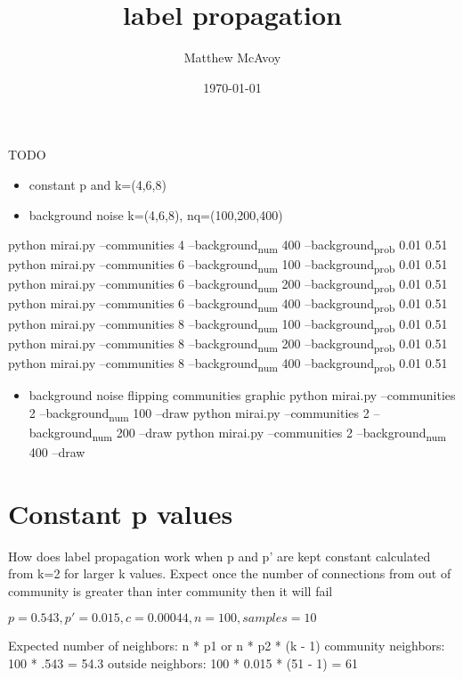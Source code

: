 \documentclass[11pt]{article}
\author{Matthew McAvoy}
\date{\today}
\title{label propagation}
\begin{document}
\maketitle
\tableofcontents

TODO
\begin{itemize}
\item constant p and k=(4,6,8)
\end{itemize}

\begin{itemize}
\item background noise k=(4,6,8), nq=(100,200,400)
\end{itemize}

python mirai.py --communities 4 --background\textsubscript{num} 400 --background\textsubscript{prob} 0.01 0.51
python mirai.py --communities 6 --background\textsubscript{num} 100 --background\textsubscript{prob} 0.01 0.51
python mirai.py --communities 6 --background\textsubscript{num} 200 --background\textsubscript{prob} 0.01 0.51
python mirai.py --communities 6 --background\textsubscript{num} 400 --background\textsubscript{prob} 0.01 0.51
python mirai.py --communities 8 --background\textsubscript{num} 100 --background\textsubscript{prob} 0.01 0.51
python mirai.py --communities 8 --background\textsubscript{num} 200 --background\textsubscript{prob} 0.01 0.51
python mirai.py --communities 8 --background\textsubscript{num} 400 --background\textsubscript{prob} 0.01 0.51
\begin{itemize}
\item background noise flipping communities graphic
python mirai.py --communities 2 --background\textsubscript{num} 100 --draw
python mirai.py --communities 2 --background\textsubscript{num} 200 --draw
python mirai.py --communities 2 --background\textsubscript{num} 400 --draw
\end{itemize}

\section{Constant p values}
\label{sec:org4fc5b74}

How does label propagation work when p and p' are kept constant calculated from k=2 for larger k values. Expect 
once the number of connections from out of community is greater than inter community then it will fail

\(p = 0.543, p' = 0.015, c = 0.00044, n = 100, samples = 10\)

Expected number of neighbors: n * p1 or n * p2 * (k - 1)
community neighbors: 100 * .543 = 54.3
outside neighbors: 100 * 0.015 * (51 - 1) = 61
\end{document}

